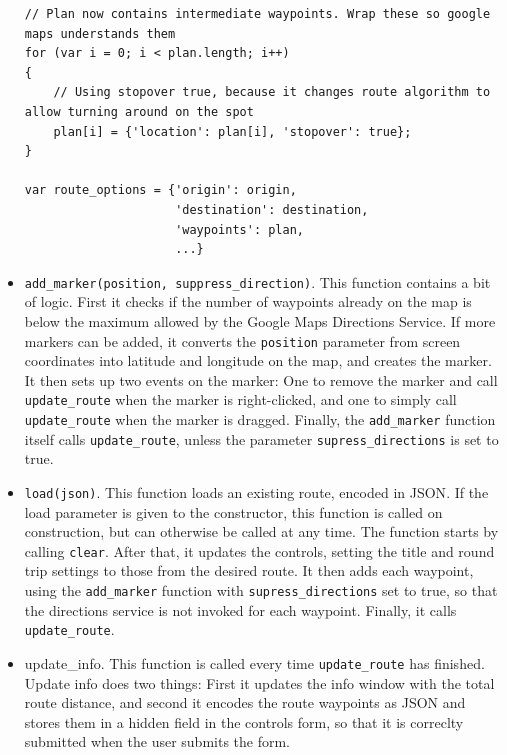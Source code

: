 \begin{itemize}
\begin{lstlisting}[label={lst:update-route-1},caption={Converting a List of Waypoints for Directions}]
// Plan now contains intermediate waypoints. Wrap these so google maps understands them
for (var i = 0; i < plan.length; i++)
{
	// Using stopover true, because it changes route algorithm to allow turning around on the spot
	plan[i] = {'location': plan[i], 'stopover': true};
}
		
var route_options = {'origin': origin,
					 'destination': destination,
					 'waypoints': plan,
					 ...}
 \end{lstlisting}
 \item \texttt{add\_marker(position, suppress\_direction)}. This function contains a bit of logic. First it checks if the number of waypoints already on the map is below the maximum allowed by the Google Maps Directions Service. If more markers can be added, it converts the \texttt{position} parameter from screen coordinates into latitude and longitude on the map, and creates the marker. It then sets up two events on the marker: One to remove the marker and call \texttt{update\_route} when the marker is right-clicked, and one to simply call \texttt{update\_route} when the marker is dragged. Finally, the \texttt{add\_marker} function itself calls \texttt{update\_route}, unless the parameter \texttt{supress\_directions} is set to true.
 \item \texttt{load(json)}. This function loads an existing route, encoded in \ac{JSON}. If the load parameter is given to the constructor, this function is called on construction, but can otherwise be called at any time. The function starts by calling \texttt{clear}. After that, it updates the controls, setting the title and round trip settings to those from the desired route. It then adds each waypoint, using the \texttt{add\_marker} function with \texttt{supress\_directions} set to true, so that the directions service is not invoked for each waypoint. Finally, it calls \texttt{update\_route}.
 \item{update\_info}. This function is called every time \texttt{update\_route} has finished. Update info does two things: First it updates the info window with the total route distance, and second it encodes the route waypoints as \ac{JSON} and stores them in a hidden field in the controls form, so that it is correclty submitted when the user submits the form.
\end{itemize}

